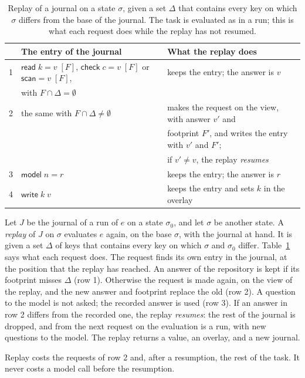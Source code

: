 \documentclass[acmsmall,nonacm,screen]{acmart}
\newcommand{\kw}[1]{\mathsf{#1}}
\newcommand{\rd}[1]{\kw{read}\;#1}
\newcommand{\wrt}[2]{\kw{write}\;#1\;#2}
\newcommand{\mdl}[1]{\kw{model}\;#1}
\newcommand{\chk}[1]{\kw{check}\;#1}
\newcommand{\scan}{\kw{scan}}
\begin{document}
\begin{table}[t]
\caption{Replay of a journal on a state $\sigma$, given a set $\Delta$ that contains every
key on which $\sigma$ differs from the base of the journal. The task is evaluated as in a
run; this is what each request does while the replay has not resumed.}
\label{tab:replay}
\small
\begin{tabular}{@{}lll@{}}
\toprule
 & The entry of the journal & What the replay does \\
\midrule
1 & $\rd{k} = v\;[F]$, $\chk{c} = v\;[F]$ or $\scan = v\;[F]$, & keeps the entry; the answer is $v$ \\
  & with $F \cap \Delta = \emptyset$ & \\
2 & the same with $F \cap \Delta \ne \emptyset$ & makes the request on the view, with answer $v'$ and \\
  & & footprint $F'$, and writes the entry with $v'$ and $F'$; \\
  & & if $v' \ne v$, the replay \emph{resumes} \\
3 & $\mdl{n} = r$ & keeps the entry; the answer is $r$ \\
4 & $\wrt{k}{v}$ & keeps the entry and sets $k$ in the overlay \\
\bottomrule
\end{tabular}
\end{table}

Let $J$ be the journal of a run of $e$ on a state $\sigma_0$, and let $\sigma$ be another
state. A \emph{replay} of $J$ on $\sigma$ evaluates $e$ again, on the base $\sigma$, with the
journal at hand. It is given a set $\Delta$ of keys that contains every key on which
$\sigma$ and $\sigma_0$ differ. Table~\ref{tab:replay} says what each request does. The
request finds its own entry in the journal, at the position that the replay has reached. An
answer of the repository is kept if its footprint misses $\Delta$ (row 1). Otherwise the
request is made again, on the view of the replay, and the new answer and footprint replace
the old (row 2). A question to the model is not asked; the recorded answer is used (row 3).
If an answer in row 2 differs from the recorded one, the replay \emph{resumes}: the rest of
the journal is dropped, and from the next request on the evaluation is a run, with new
questions to the model. The replay returns a value, an overlay, and a new journal.

Replay costs the requests of row 2 and, after a resumption, the rest of the task. It never
costs a model call before the resumption.
\end{document}
